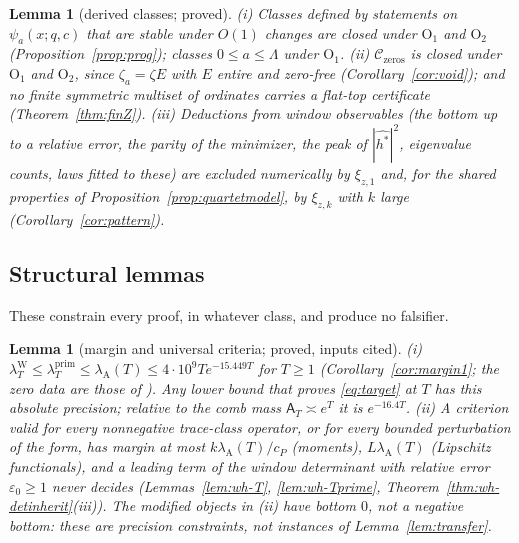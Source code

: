\documentclass[11pt]{amsart}
\newtheorem{lemma}[theorem]{Lemma}
\theoremstyle{definition}
\theoremstyle{remark}
\newcommand{\lamP}{\lambda^{\mathrm{prim}}_T}
\newcommand{\lamW}{\lambda^{\mathrm W}_T}
\newcommand{\lamA}{\lambda_{\mathrm A}(T)}
\newcommand{\Aconst}{\mathsf A_T}
\begin{document}
\begin{lemma}[derived classes; proved]\label{lem:shape-classes}
\emph{(i)} Classes defined by statements on $\psi_a(x;q,c)$ that are stable under $O(1)$ changes are closed under $\mathrm O_1$ and
$\mathrm O_2$ (Proposition~\ref{prop:prog}); classes $0\le a\le\Lambda$ under $\mathrm O_1$. \emph{(ii)} $\mathcal C_{\mathrm{zeros}}$ is
closed under $\mathrm O_1$ and $\mathrm O_2$, since $\zeta_a=\zeta E$ with $E$ entire and zero-free (Corollary~\ref{cor:void}); and no finite
symmetric multiset of ordinates carries a flat-top certificate (Theorem~\ref{thm:finZ}). \emph{(iii)} Deductions from window observables
(the bottom up to a relative error, the parity of the minimizer, the peak of $|\widehat{h^*}|^2$, eigenvalue counts, laws fitted to these)
are excluded numerically by $\xi_{z,1}$ and, for the shared properties of Proposition~\ref{prop:quartetmodel}, by $\xi_{z,k}$ with $k$ large
(Corollary~\ref{cor:pattern}).
\end{lemma}

\subsection{Structural lemmas}

These constrain every proof, in whatever class, and produce no falsifier.

\begin{lemma}[margin and universal criteria; proved, inputs cited]\label{lem:shape-margin}
\emph{(i)} $\lamW\le\lamP\le\lamA\le4\cdot10^9Te^{-15.449T}$ for $T\ge1$ (Corollary~\ref{cor:margin1}; the zero data are those of
\cite{PlattTrudgian2021}). Any lower bound that proves \eqref{eq:target} at $T$ has this absolute precision; relative to the comb mass
$\Aconst\asymp e^T$ it is $e^{-16.4T}$. \emph{(ii)} A criterion valid for every nonnegative trace-class operator, or for every bounded
perturbation of the form, has margin at most $k\lamA/c_P$ (moments), $L\lamA$ (Lipschitz functionals), and a leading term of the window
determinant with relative error $\varepsilon_0\ge1$ never decides (Lemmas~\ref{lem:wh-T}, \ref{lem:wh-Tprime},
Theorem~\ref{thm:wh-detinherit}(iii)). The modified objects in (ii) have bottom $0$, not a negative bottom: these are precision
constraints, not instances of Lemma~\ref{lem:transfer}.
\end{lemma}
\end{document}
